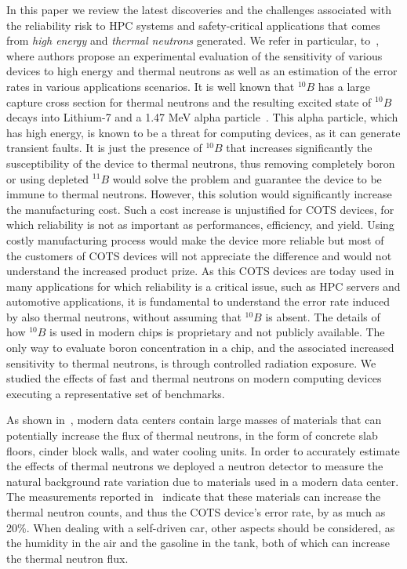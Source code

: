 In this paper we review the latest discoveries and the challenges associated with the reliability risk to HPC systems and safety-critical applications that comes from \textit{high energy} and \textit{thermal neutrons} generated. We refer in particular, to~\cite{ets2020, jsc2020}, where authors propose an experimental evaluation of the sensitivity of various devices to high energy and thermal neutrons as well as an estimation of the error rates in various applications scenarios.
It is well known that $^{10}B$ has a large capture cross section for thermal neutrons and the resulting excited state of $^{10}B$ decays into Lithium-7 and a 1.47 MeV alpha particle~\cite{ziegler2004ser, Baumann2005}. This alpha particle, which has high energy, is known to be a threat for computing devices, as it can generate transient faults. It is just the presence of $^{10}B$ that increases significantly the susceptibility of the device to thermal neutrons, thus removing completely boron or using depleted $^{11}B$ would solve the problem and guarantee the device to be immune to thermal neutrons. However, this solution would significantly increase the manufacturing cost. Such a cost increase is unjustified for COTS devices, for which reliability is not as important as performances, efficiency, and yield. Using costly manufacturing process would make the device more reliable but most of the customers of COTS devices will not appreciate the difference and would not understand the increased product prize. As this COTS devices are today used in many applications for which reliability is a critical issue, such as HPC servers and automotive applications, it is fundamental to understand the error rate induced by also thermal neutrons, without assuming that $^{10}B$ is absent. The details of how  $^{10}B$ is used in modern chips is proprietary and not publicly available. The only way to evaluate boron concentration in a chip, and the associated increased sensitivity to thermal neutrons, is through controlled radiation exposure. We studied the effects of fast and thermal neutrons on modern computing devices executing a representative set of benchmarks.

As shown in~\cite{jsc2020}, modern data centers contain large masses of materials that can potentially increase the flux of thermal neutrons, in the form of concrete slab floors, cinder block walls, and water cooling units. In order to accurately estimate the effects of thermal neutrons we deployed a neutron detector to measure the natural background rate variation due to materials used in a modern data center. The measurements reported in~\cite{jsc2020} indicate that these materials  can increase the thermal neutron counts, and thus the COTS device's error rate, by as much as 20\%. When dealing with a self-driven car, other aspects should be considered, as the humidity in the air and the gasoline in the tank, both of which can increase the thermal neutron flux.

